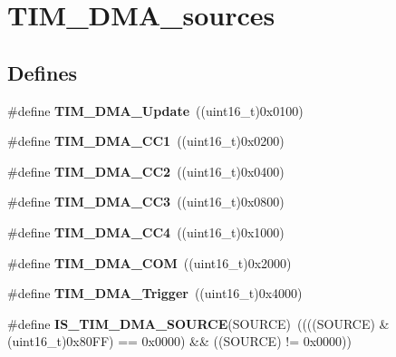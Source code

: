 \hypertarget{group__TIM__DMA__sources}{
\section{TIM\_\-DMA\_\-sources}
\label{group__TIM__DMA__sources}
}
\subsection*{Defines}
\begin{DoxyCompactItemize}
\item 
\hypertarget{group__TIM__DMA__sources_ga013a49e5cceb263f01941aef968dea9c}{
\#define {\bfseries TIM\_\-DMA\_\-Update}~((uint16\_\-t)0x0100)}
\label{group__TIM__DMA__sources_ga013a49e5cceb263f01941aef968dea9c}

\item 
\hypertarget{group__TIM__DMA__sources_ga33b93e8bb82fe8e167b9e9c962c54f83}{
\#define {\bfseries TIM\_\-DMA\_\-CC1}~((uint16\_\-t)0x0200)}
\label{group__TIM__DMA__sources_ga33b93e8bb82fe8e167b9e9c962c54f83}

\item 
\hypertarget{group__TIM__DMA__sources_ga792f73196a8e7424655592097d7a3fd5}{
\#define {\bfseries TIM\_\-DMA\_\-CC2}~((uint16\_\-t)0x0400)}
\label{group__TIM__DMA__sources_ga792f73196a8e7424655592097d7a3fd5}

\item 
\hypertarget{group__TIM__DMA__sources_ga3eb2dadbd3109bced45935fb53deeee1}{
\#define {\bfseries TIM\_\-DMA\_\-CC3}~((uint16\_\-t)0x0800)}
\label{group__TIM__DMA__sources_ga3eb2dadbd3109bced45935fb53deeee1}

\item 
\hypertarget{group__TIM__DMA__sources_ga59495cf79894dfe5e5b2029863aed956}{
\#define {\bfseries TIM\_\-DMA\_\-CC4}~((uint16\_\-t)0x1000)}
\label{group__TIM__DMA__sources_ga59495cf79894dfe5e5b2029863aed956}

\item 
\hypertarget{group__TIM__DMA__sources_gac5f4c56e944bda8ba0c23b97275020ba}{
\#define {\bfseries TIM\_\-DMA\_\-COM}~((uint16\_\-t)0x2000)}
\label{group__TIM__DMA__sources_gac5f4c56e944bda8ba0c23b97275020ba}

\item 
\hypertarget{group__TIM__DMA__sources_ga81ad169a378969524e61396337d84a0a}{
\#define {\bfseries TIM\_\-DMA\_\-Trigger}~((uint16\_\-t)0x4000)}
\label{group__TIM__DMA__sources_ga81ad169a378969524e61396337d84a0a}

\item 
\hypertarget{group__TIM__DMA__sources_gafb9cb1995ea4cd37db6032d80a49cd47}{
\#define {\bfseries IS\_\-TIM\_\-DMA\_\-SOURCE}(SOURCE)~((((SOURCE) \& (uint16\_\-t)0x80FF) == 0x0000) \&\& ((SOURCE) != 0x0000))}
\label{group__TIM__DMA__sources_gafb9cb1995ea4cd37db6032d80a49cd47}

\end{DoxyCompactItemize}
